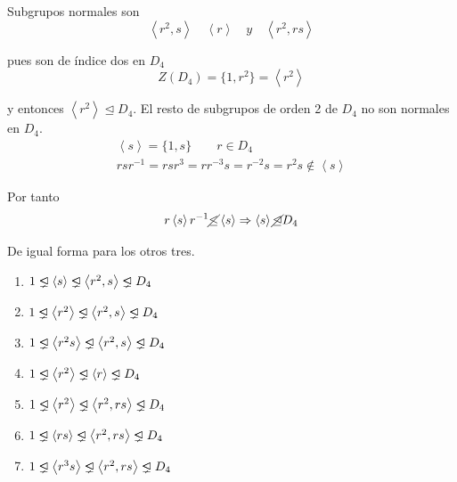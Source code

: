 \documentclass{article}
\newcommand{\unlhdneq}{%
  \mathrel{\ooalign{$\lneq$\cr\raise.22ex\hbox{$\lhd$}\cr}}}
\begin{document}
Subgrupos normales son 
\begin{equation*}
\left\langle r^2,s\right\rangle \quad \left\langle r\right\rangle \quad y\quad \left\langle r^2,rs \right\rangle
\end{equation*}

pues son de índice dos en $D_4$ 
\begin{equation*}
Z(D_4)=\{1,r^2\}=\left\langle r^2\right\rangle
\end{equation*}

y entonces $\left\langle r^2\right\rangle \unlhd D_4$. El resto de subgrupos de orden 2 de $D_4$ no son normales en $D_4$.
\begin{gather*}
\left\langle s\right\rangle =\{1,s\} \qquad r\in D_4 \\
rsr^{-1}=rsr^3=rr^{-3}s=r^{-2}s=r^2s\notin \left\langle s\right\rangle
\end{gather*}

Por tanto 
\begin{equation*}
r\left\langle s\right\rangle r^{-1} \cancel{\leq } \left\langle s\right\rangle \Rightarrow\left\langle s\right\rangle \cancel{\unlhd} D_4
\end{equation*}

De igual forma para los otros tres. \\
\begin{enumerate}
\item $1\unlhdneq \left\langle s \right\rangle \unlhdneq \left\langle r^2,s\right\rangle \unlhdneq D_4$

\item $1\unlhdneq \left\langle r^2 \right\rangle \unlhdneq \left\langle r^2,s\right\rangle \unlhdneq D_4$

\item $1\unlhdneq \left\langle r^2s \right\rangle \unlhdneq \left\langle r^2,s\right\rangle \unlhdneq D_4$

\item $1\unlhdneq \left\langle r^2 \right\rangle \unlhdneq \left\langle r\right\rangle \unlhdneq D_4$

\item $1\unlhdneq \left\langle r^2 \right\rangle \unlhdneq \left\langle r^2,rs\right\rangle \unlhdneq D_4$

\item $1\unlhdneq \left\langle rs \right\rangle \unlhdneq \left\langle r^2,rs\right\rangle \unlhdneq D_4$

\item $1\unlhdneq \left\langle r^3s \right\rangle \unlhdneq \left\langle r^2,rs\right\rangle \unlhdneq D_4$
\end{enumerate}
\end{document}
